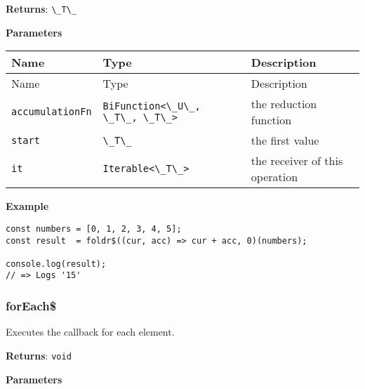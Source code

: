 \textbf{Returns}: \passthrough{\lstinline!\_T\_!}

\textbf{Parameters}

\begin{longtable}[]{
  >{\raggedright\arraybackslash}p{}
  >{\raggedright\arraybackslash}p{}
  >{\raggedright\arraybackslash}p{}@{}}

\toprule\noalign{}
Name & Type & Description \\
\midrule\noalign{}
\endfirsthead
\toprule\noalign{}
Name & Type & Description \\
\midrule\noalign{}
\endhead
\bottomrule\noalign{}
\endlastfoot
\passthrough{\lstinline!accumulationFn!} &
\passthrough{\lstinline!BiFunction<\_U\_, \_T\_, \_T\_>!} & the
reduction function \\
\passthrough{\lstinline!start!} & \passthrough{\lstinline!\_T\_!} & the
first value \\
\passthrough{\lstinline!it!} & \passthrough{\lstinline!Iterable<\_T\_>!}
& the receiver of this operation \\
\end{longtable}

\textbf{Example}

\begin{lstlisting}[label=899c82bd-0132-4f44-bf93-a84abb761f92]
const numbers = [0, 1, 2, 3, 4, 5];
const result  = foldr$((cur, acc) => cur + acc, 0)(numbers);
                                                            
console.log(result);
// => Logs '15'
\end{lstlisting}

\hypertarget{ae20de4d-81d9-49b3-a519-ce7fcad4bf13}{%
\subsubsection{forEach\$}\label{ae20de4d-81d9-49b3-a519-ce7fcad4bf13}}

Executes the callback for each element.

\textbf{Returns}: \passthrough{\lstinline!void!}

\textbf{Parameters}

